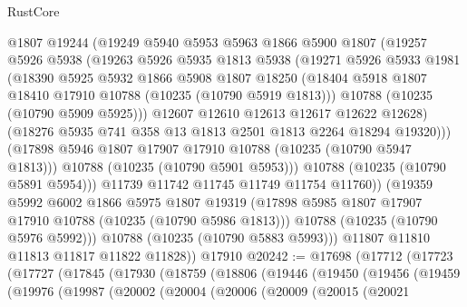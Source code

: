 \begin{lexlean}{RustCore}
\begin{coremodule}
                @1807
                @19244
                (@19249
                  @5940
                  @5953
                  @5963
                  @1866
                  @5900
                  @1807
                  (@19257
                    @5926
                    @5938
                    (@19263
                      @5926
                      @5935
                      @1813
                      @5938
                      (@19271
                        @5926
                        @5933
                        @1981
                        (@18390
                          @5925
                          @5932
                          @1866
                          @5908
                          @1807
                          @18250
                          (@18404 @5918 @1807 @18410 @17910 @10788 (@10235 (@10790 @5919 @1813)))
                          @10788
                          (@10235 (@10790 @5909 @5925)))
                        @12607
                        @12610
                        @12613
                        @12617
                        @12622
                        @12628)
                      (@18276 @5935 @741 @358 @13 @1813 @2501 @1813 @2264 @18294 @19320)))
                  (@17898 @5946 @1807 @17907 @17910 @10788 (@10235 (@10790 @5947 @1813)))
                  @10788
                  (@10235 (@10790 @5901 @5953)))
                @10788
                (@10235 (@10790 @5891 @5954)))
              @11739
              @11742
              @11745
              @11749
              @11754
              @11760))
          (@19359
            @5992
            @6002
            @1866
            @5975
            @1807
            @19319
            (@17898 @5985 @1807 @17907 @17910 @10788 (@10235 (@10790 @5986 @1813)))
            @10788
            (@10235 (@10790 @5976 @5992)))
          @10788
          (@10235 (@10790 @5883 @5993)))
        @11807
        @11810
        @11813
        @11817
        @11822
        @11828))
    @17910
@20242 := @17698
    (@17712
      (@17723
        (@17727
          (@17845
            (@17930
              (@18759
                (@18806
                  (@19446
                    (@19450
                      (@19456
                        (@19459
                          (@19976
                            (@19987
                              (@20002
                                (@20004
                                  (@20006
                                    (@20009
                                      (@20015
                                        (@20021

\end{coremodule}
\end{lexlean}
